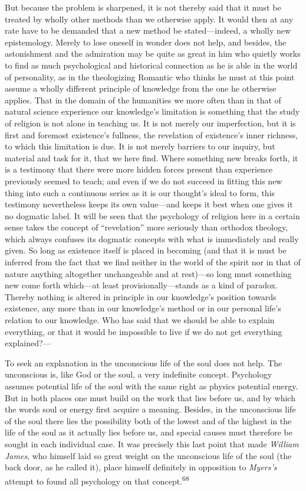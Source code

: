 \documentclass[12pt,a4paper]{book}
\newcommand{\opage}[1]{\marginnote{\footnotesize\textit{[#1]}}}
\begin{document}
But because the problem is sharpened, it is not thereby said that it must be treated by wholly other
methods than we otherwise apply. It would then at any rate have to be demanded that a new method be
stated---indeed, a wholly new epistemology. Merely to lose oneself in wonder does not help, and
besides, the astonishment and the admiration may be quite as great in him who quietly works to find as
much psychological and historical connection as he is able in the world of personality, as in the
theologizing Romantic who thinks he must at this point assume a wholly different principle of
knowledge from the one he otherwise applies. That in the domain of the humanities we more often than
in that of natural science experience our knowledge's limitation is something that the study of
religion is not alone in teaching us. It is not merely our imperfection, but it is first and foremost
existence's fullness, the revelation of existence's inner richness, to which this limitation is due.
It is not merely barriers to our inquiry, but material and task for it, that we here find. Where
something new breaks forth, it is a testimony that there were more hidden forces present than
experience previously seemed to teach; and even if we do not succeed in fitting this new thing into
such a continuous series as it 
\opage{132}is our thought's ideal to form, this testimony nevertheless keeps its
own value---and keeps it best when one gives it no dogmatic label. It will be seen that the psychology
of religion here in a certain sense takes the concept of ``revelation'' more seriously than orthodox
theology, which always confuses its dogmatic concepts with what is immediately and really given. So
long as existence itself is placed in becoming (and that it is must be inferred from the fact that we
find neither in the world of the spirit nor in that of nature anything altogether unchangeable and at
rest)---so long must something new come forth which---at least provisionally---stands as a kind of
paradox. Thereby nothing is altered in principle in our knowledge's position towards existence, any
more than in our knowledge's method or in our personal life's relation to our knowledge. Who has said
that we should be able to explain everything, or that it would be impossible to live if we do not get
everything explained?---

To seek an explanation in the unconscious life of the soul does not help. The unconscious is, like God
or the soul, a very indefinite concept. Psychology assumes potential life of the soul with the same
right as physics potential energy. But in both places one must build on the work that lies before us,
and by which the words soul or energy first acquire a meaning. Besides, in the unconscious life of the
soul there lies the possibility both of the lowest and of the highest in the life of the soul as it
actually lies before us, and special causes must therefore be sought in each individual case. It was
precisely this last point that made \emph{William James}, who himself laid so great weight on the
unconscious life of the soul (the back door, as he called it), place himself definitely in opposition
to \emph{Myers's} attempt to found all psychology on that concept.\textsuperscript{68}
\end{document}
